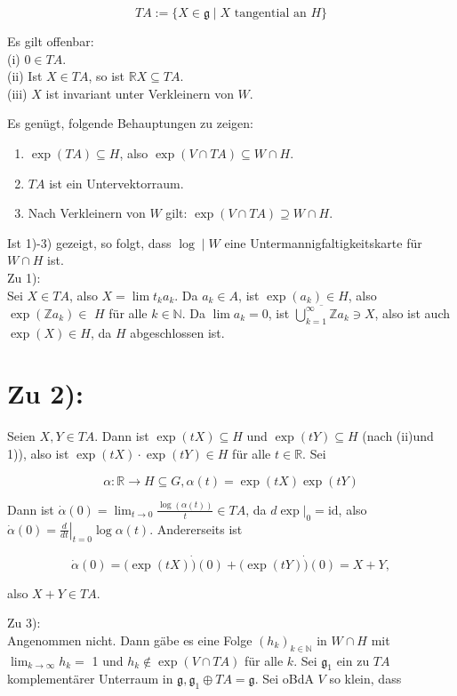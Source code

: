 \documentclass[10pt, letterpaper]{article}
\begin{document}
$$
T A:=\{X \in \mathfrak{g} \mid X \text { tangential an } H\}
$$

Es gilt offenbar:\\
(i) $0 \in T A$.\\
(ii) Ist $X \in T A$, so ist $\mathbb{R} X \subseteq T A$.\\
(iii) $X$ ist invariant unter Verkleinern von $W$.

Es genügt, folgende Behauptungen zu zeigen:

\begin{enumerate}
  \item $\exp (T A) \subseteq H$, also $\exp (V \cap T A) \subseteq W \cap H$.
  \item $T A$ ist ein Untervektorraum.
  \item Nach Verkleinern von $W$ gilt: $\exp (V \cap T A) \supseteq W \cap H$.
\end{enumerate}

Ist 1)-3) gezeigt, so folgt, dass $\log \mid W$ eine Untermannigfaltigkeitskarte für $W \cap H$ ist.\\
Zu 1):\\
Sei $X \in T A$, also $X=\lim t_{k} a_{k}$. Da $a_{k} \in A$, ist $\exp \left(a_{k}\right) \in H$, also $\exp \left(\mathbb{Z} a_{k}\right) \in$ $H$ für alle $k \in \mathbb{N}$. Da $\lim a_{k}=0$, ist $\overline{\bigcup_{k=1}^{\infty} \mathbb{Z} a_{k}} \ni X$, also ist auch $\exp (X) \in H$, da $H$ abgeschlossen ist.

\section*{Zu 2):}
Seien $X, Y \in T A$. Dann ist $\exp (t X) \subseteq H$ und $\exp (t Y) \subseteq H$ (nach (ii)und 1)), also ist $\exp (t X) \cdot \exp (t Y) \in H$ für alle $t \in \mathbb{R}$. Sei

$$
\alpha: \mathbb{R} \rightarrow H \subseteq G, \alpha(t)=\exp (t X) \exp (t Y)
$$

Dann ist $\dot{\alpha}(0)=\lim _{t \rightarrow 0} \frac{\log (\alpha(t))}{t} \in T A$, da $\left.d \exp \right|_{0}=\mathrm{id}$, also $\dot{\alpha}(0)=\left.\frac{d}{d t}\right|_{t=0} \log \alpha(t)$. Andererseits ist

$$
\dot{\alpha}(0)=(\exp (t X) \dot{)}(0)+(\exp (t Y) \dot{)}(0)=X+Y,
$$

also $X+Y \in T A$.

Zu 3):\\
Angenommen nicht. Dann gäbe es eine Folge $\left(h_{k}\right)_{k \in \mathbb{N}}$ in $W \cap H$ mit $\lim _{k \rightarrow \infty} h_{k}=$ 1 und $h_{k} \notin \exp (V \cap T A)$ für alle $k$. Sei $\mathfrak{g}_{1}$ ein zu $T A$ komplementärer Unterraum in $\mathfrak{g}, \mathfrak{g}_{1} \oplus T A=\mathfrak{g}$. Sei oBdA $V$ so klein, dass
\end{document}
